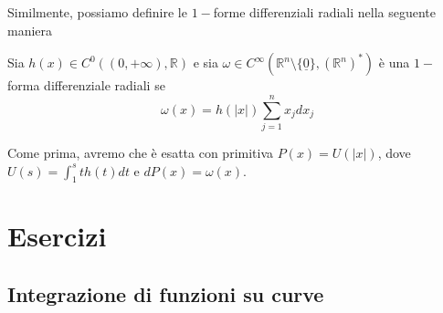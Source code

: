 Similmente, possiamo definire le $1-$forme differenziali radiali nella seguente maniera

\vspace{0.5cm}
\begin{definition}[\textcolor{blue}{$1-$forma differenziale radiale}]
	Sia $h(x) \in C^0((0, +\infty), \mathbb{R})$ e sia $\omega \in C^{\infty}(\mathbb{R}^n \setminus \{ \underline{0} \}, (\mathbb{R}^n)^*)$ è una $1-$ forma differenziale radiali se
	$$
		\omega(x) = h(|x|)\sum_{j=1}^n x_j dx_j
	$$
\end{definition}

Come prima, avremo che è esatta con primitiva $P(x)=U(|x|)$, dove $U(s) = \int_1^s th(t)dt$ e $dP(x)=\omega(x)$.


\section{Esercizi}


%
\subsection{Integrazione di funzioni su curve}

